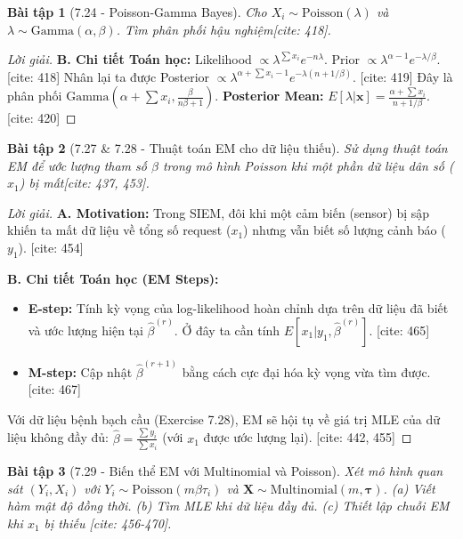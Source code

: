\documentclass[8pt,a4paper]{article}
\newtheorem{exercise}{Bài tập}
\newenvironment{solution}{\begin{proof}[Lời giải]}{\end{proof}}
\begin{document}
\begin{exercise}[7.24 - Poisson-Gamma Bayes]
Cho $X_i \sim \text{Poisson}(\lambda)$ và $\lambda \sim \text{Gamma}(\alpha, \beta)$. Tìm phân phối hậu nghiệm[cite: 418].
\end{exercise}

\begin{solution}
\textbf{B. Chi tiết Toán học:}
Likelihood $\propto \lambda^{\sum x_i} e^{-n\lambda}$. Prior $\propto \lambda^{\alpha-1} e^{-\lambda/\beta}$. [cite: 418]
Nhân lại ta được Posterior $\propto \lambda^{\alpha + \sum x_i - 1} e^{-\lambda(n + 1/\beta)}$. [cite: 419]
Đây là phân phối $\text{Gamma}(\alpha + \sum x_i, \frac{\beta}{n\beta + 1})$.
\textbf{Posterior Mean:} $E[\lambda|\mathbf{x}] = \frac{\alpha + \sum x_i}{n + 1/\beta}$. [cite: 420]
\end{solution}

\begin{exercise}[7.27 \& 7.28 - Thuật toán EM cho dữ liệu thiếu]
Sử dụng thuật toán EM để ước lượng tham số $\beta$ trong mô hình Poisson khi một phần dữ liệu dân số ($x_1$) bị mất[cite: 437, 453].
\end{exercise}

\begin{solution}
\textbf{A. Motivation:} Trong SIEM, đôi khi một cảm biến (sensor) bị sập khiến ta mất dữ liệu về tổng số request ($x_1$) nhưng vẫn biết số lượng cảnh báo ($y_1$). [cite: 454]

\textbf{B. Chi tiết Toán học (EM Steps):}
\begin{itemize}
    \item \textbf{E-step:} Tính kỳ vọng của log-likelihood hoàn chỉnh dựa trên dữ liệu đã biết và ước lượng hiện tại $\hat{\beta}^{(r)}$. Ở đây ta cần tính $E[x_1 | y_1, \hat{\beta}^{(r)}]$. [cite: 465]
    \item \textbf{M-step:} Cập nhật $\hat{\beta}^{(r+1)}$ bằng cách cực đại hóa kỳ vọng vừa tìm được. [cite: 467]
\end{itemize}
Với dữ liệu bệnh bạch cầu (Exercise 7.28), EM sẽ hội tụ về giá trị MLE của dữ liệu không đầy đủ: $\hat{\beta} = \frac{\sum y_i}{\sum x_i}$ (với $x_1$ được ước lượng lại). [cite: 442, 455]
\end{solution}


\begin{exercise}[7.29 - Biến thể EM với Multinomial và Poisson]
Xét mô hình quan sát $(Y_i, X_i)$ với $Y_i \sim \text{Poisson}(m\beta\tau_i)$ và $\mathbf{X} \sim \text{Multinomial}(m, \boldsymbol{\tau})$. 
(a) Viết hàm mật độ đồng thời. (b) Tìm MLE khi dữ liệu đầy đủ. (c) Thiết lập chuỗi EM khi $x_1$ bị thiếu [cite: 456-470].
\end{exercise}
\end{document}
